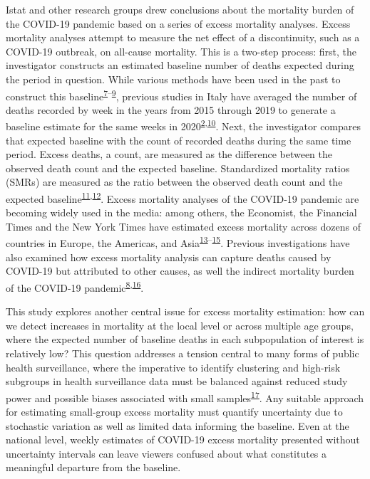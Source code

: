 \documentclass[
]{article}
\begin{document}
Istat and other research groups drew conclusions about the mortality burden of the COVID-19 pandemic based on a series of excess mortality analyses. Excess mortality analyses attempt to measure the net effect of a discontinuity, such as a COVID-19 outbreak, on all-cause mortality. This is a two-step process: first, the investigator constructs an estimated baseline number of deaths expected during the period in question. While various methods have been used in the past to construct this baseline\textsuperscript{\protect\hyperlink{ref-Serfling1963}{7}--\protect\hyperlink{ref-Noufaily2013}{9}}⁠, previous studies in Italy have averaged the number of deaths recorded by week in the years from 2015 through 2019 to generate a baseline estimate for the same weeks in 2020\textsuperscript{\protect\hyperlink{ref-Alicandro2020}{2},\protect\hyperlink{ref-Michelozzi2020}{10}}⁠. Next, the investigator compares that expected baseline with the count of recorded deaths during the same time period. Excess deaths, a count, are measured as the difference between the observed death count and the expected baseline. Standardized mortality ratios (SMRs) are measured as the ratio between the observed death count and the expected baseline\textsuperscript{\protect\hyperlink{ref-Dickman2004}{11},\protect\hyperlink{ref-Lambert2005}{12}}⁠. Excess mortality analyses of the COVID-19 pandemic are becoming widely used in the media: among others, the Economist, the Financial Times and the New York Times have estimated excess mortality across dozens of countries in Europe, the Americas, and Asia\textsuperscript{\protect\hyperlink{ref-Wu2020}{13}--\protect\hyperlink{ref-FTVisualDataJournalismteam2020}{15}}⁠. Previous investigations have also examined how excess mortality analysis can capture deaths caused by COVID-19 but attributed to other causes, as well the indirect mortality burden of the COVID-19 pandemic\textsuperscript{\protect\hyperlink{ref-Weinberger2020a}{8},\protect\hyperlink{ref-U.S.NationalCenterforHealthStatistics2021}{16}}.

This study explores another central issue for excess mortality estimation: how can we detect increases in mortality at the local level or across multiple age groups, where the expected number of baseline deaths in each subpopulation of interest is relatively low? This question addresses a tension central to many forms of public health surveillance, where the imperative to identify clustering and high-risk subgroups in health surveillance data must be balanced against reduced study power and possible biases associated with small samples\textsuperscript{\protect\hyperlink{ref-Thacker1988}{17}}⁠. Any suitable approach for estimating small-group excess mortality must quantify uncertainty due to stochastic variation as well as limited data informing the baseline. Even at the national level, weekly estimates of COVID-19 excess mortality presented without uncertainty intervals can leave viewers confused about what constitutes a meaningful departure from the baseline.
\end{document}
